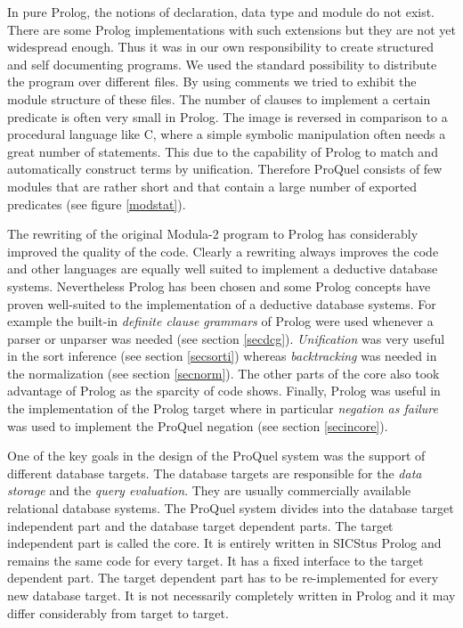 In pure Prolog, the notions of declaration, data type and module do not exist. There are some
Prolog implementations with such extensions but they are not yet widespread enough. Thus it
was in our own responsibility to create structured and self documenting programs. We used the 
standard possibility to distribute the program over different files. By using comments we 
tried to exhibit the module structure of these files. The number of clauses to implement a certain 
predicate is often very small in Prolog. The image is reversed in comparison to a procedural 
language like C, where a simple symbolic manipulation often needs a great number of statements. 
This due to the capability of Prolog to match and automatically construct terms by unification. 
Therefore ProQuel consists of few modules that are rather short and that contain a large number 
of exported predicates (see figure \ref{modstat}).

The rewriting of the original Modula-2 program to Prolog has considerably improved the quality of 
the code. Clearly a rewriting always improves the code and other languages are equally well suited
to implement a deductive database systems. Nevertheless Prolog has been chosen and some Prolog 
concepts have proven well-suited to the implementation of a deductive database systems. For 
example the built-in {\em definite clause grammars} of Prolog were used whenever a parser or 
unparser was needed (see section \ref{secdcg}). {\em Unification} was very useful in the sort 
inference (see section \ref{secsorti}) whereas {\em backtracking} was needed in the normalization 
(see section \ref{secnorm}). The other parts of the core also took advantage of Prolog as the 
sparcity of code shows. Finally, Prolog was useful in the implementation of the Prolog target 
where in particular {\em negation as failure} was used to implement the ProQuel negation (see
section \ref{secincore}).

\label{secct}
One of the key goals in the design of the ProQuel system was the support of different database
targets. The database targets are responsible for the {\em data storage} and the {\em query 
evaluation}. They are usually commercially available relational database systems. The ProQuel 
system divides into the database target independent part and the database target dependent parts. 
The target independent part is called the core. It is entirely written in SICStus Prolog and 
remains the same code for every target. It has a fixed interface to the target dependent part. 
The target dependent part has to be re-implemented for every new database target. It is not 
necessarily completely written in Prolog and it may differ considerably from target to target.

